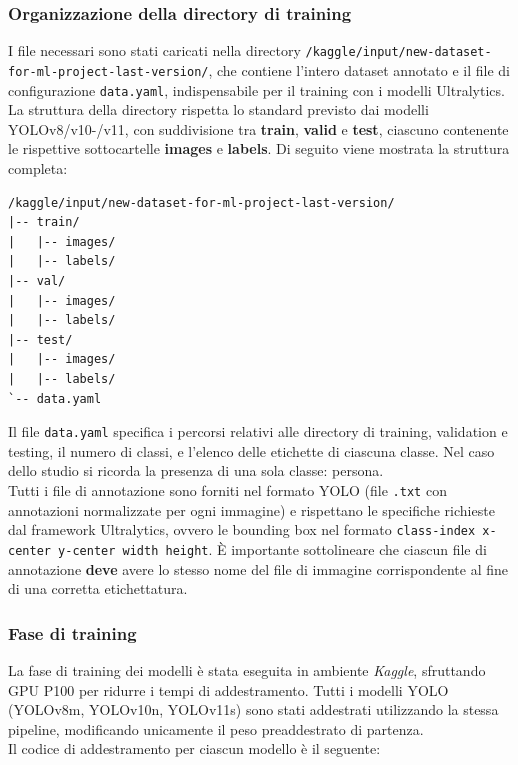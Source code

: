 \documentclass[12pt]{article}
\begin{document}
\subsubsection{Organizzazione della directory di training}
I file necessari sono stati caricati nella directory \texttt{/kaggle/input/new-dataset-}\\
\texttt{for-ml-project-last-version/}, che contiene l'intero dataset annotato e il file di configurazione \texttt{data.yaml}, indispensabile per il training con i modelli Ultralytics.\\
La struttura della directory rispetta lo standard previsto dai modelli YOLOv8/v10-/v11, con suddivisione tra \textbf{train},\textbf{ valid }e \textbf{test}, ciascuno contenente le rispettive sottocartelle \textbf{images} e \textbf{labels}. Di seguito viene mostrata la struttura completa:

\begin{verbatim}
/kaggle/input/new-dataset-for-ml-project-last-version/
|-- train/
|   |-- images/
|   |-- labels/
|-- val/
|   |-- images/
|   |-- labels/
|-- test/
|   |-- images/
|   |-- labels/
`-- data.yaml  
\end{verbatim}
Il file \texttt{data.yaml} specifica i percorsi relativi alle directory di training, validation e testing, il numero di classi, e l'elenco delle etichette di ciascuna classe. Nel caso dello studio si ricorda la presenza di una sola classe: persona.\\
Tutti i file di annotazione sono forniti nel formato YOLO (file \texttt{.txt} con annotazioni normalizzate per ogni immagine) e rispettano le specifiche richieste dal framework Ultralytics, ovvero le bounding box nel formato \texttt{class-index x-center y-center width height}. È importante sottolineare che ciascun file di annotazione \textbf{deve} avere lo stesso nome del file di immagine corrispondente al fine di una corretta etichettatura.


\subsubsection{Fase di training}
La fase di training dei modelli è stata eseguita in ambiente \textit{Kaggle}, sfruttando GPU P100 per ridurre i tempi di addestramento. Tutti i modelli YOLO (YOLOv8m, YOLOv10n, YOLOv11s) sono stati addestrati utilizzando la stessa pipeline, modificando unicamente il peso preaddestrato di partenza.\\
Il codice di addestramento per ciascun modello è il seguente:
\end{document}
